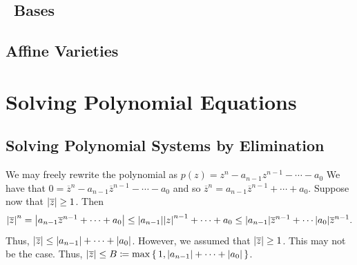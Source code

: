 \documentclass[letterpaper, 11pt, oneside]{book}
\begin{document}
\clearpage

\section{\Grobner\ Bases}

\begin{sol}\label{ex:UAG_1.3.11}

\end{sol}

\clearpage

\section{Affine Varieties}

\begin{sol}\label{ex:UAG_1.4.9}

\end{sol}

\chapter{Solving Polynomial Equations}

\section{Solving Polynomial Systems by Elimination}

\begin{sol}\label{ex:UAG_2.1.1}

\end{sol}

\begin{sol}\label{ex:UAG_2.1.2}

\end{sol}

\begin{sol}\label{ex:UAG_2.1.3}
  We may freely rewrite the polynomial as $p(z) = z^{n} - a_{n - 1}z^{n - 1} - \cdots - a_{0}$
  We have that $0 = \overline{z}^{n} - a_{n - 1}\overline{z}^{n - 1} - \cdots - a_{0}$ and so $\overline{z}^{n} = a_{n - 1}\overline{z}^{n - 1} + \cdots + a_{0}$.
  Suppose now that $\abs{\overline{z}} \geq 1$.
  Then
  \[
    \abs{\overline{z}}^{n} = \abs{a_{n - 1}\overline{z}^{n - 1} + \cdots + a_{0}} \leq \abs{a_{n - 1}}\abs{z}^{n - 1} + \cdots + a_{0} \leq \abs{a_{n - 1}}\overline{z}^{n - 1} + \cdots \abs{a_{0}}\overline{z}^{n - 1}.
  \]
  Thus, $\abs{\overline{z}} \leq \abs{a_{n - 1}} + \cdots + \abs{a_{0}}$.
  However, we assumed that $\abs{\overline{z}} \geq 1$.
  This may not be the case.
  Thus, $\abs{\overline{z}} \leq B \coloneqq \max\set{1, \abs{a_{n - 1}} + \cdots + \abs{a_{0}}}$.
\end{sol}
\end{document}
